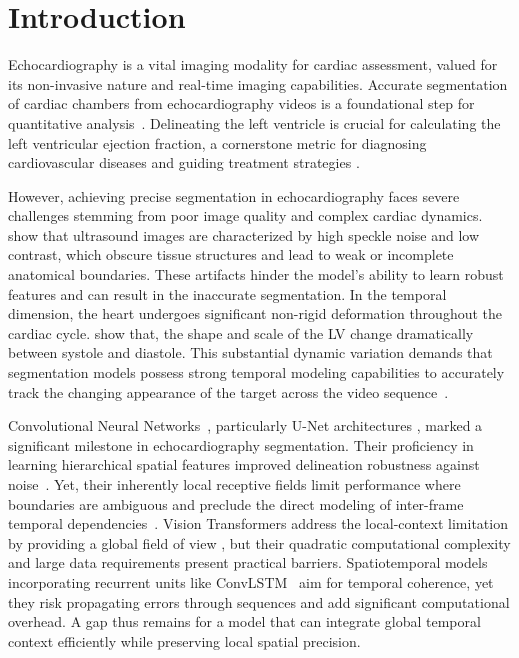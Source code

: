 \section{Introduction}
    \label{sec:intro}
Echocardiography is a vital imaging modality for cardiac assessment, valued for its non-invasive nature and real-time imaging capabilities. Accurate segmentation of cardiac chambers from echocardiography videos is a foundational step for quantitative analysis~\cite{el2022semi}. Delineating the left ventricle is crucial for calculating the left ventricular ejection fraction, a cornerstone metric for diagnosing cardiovascular diseases and guiding treatment strategies \cite{amer2021resdunet,yang2024echocardiography}.
%
                
%

However, achieving precise segmentation in echocardiography faces severe challenges stemming from poor image quality and complex cardiac dynamics.  show that ultrasound images are characterized by high speckle noise and low contrast, which obscure tissue structures and lead to weak or incomplete anatomical boundaries. These artifacts hinder the model's ability to learn robust features and can result in the inaccurate segmentation. In the temporal dimension, the heart undergoes significant non-rigid deformation throughout the cardiac cycle.  show that, the shape and scale of the LV change dramatically between systole and diastole. This substantial dynamic variation demands that segmentation models possess strong temporal modeling capabilities to accurately track the changing appearance of the target across the video sequence~\cite{li2024automatic}.

Convolutional Neural Networks~\cite{oshea2015introductionconvolutionalneuralnetworks}, particularly U-Net architectures \cite{ronneberger2015u,long2015fully,iglovikov2018ternausnet}, marked a significant milestone in echocardiography segmentation. Their proficiency in learning hierarchical spatial features improved delineation robustness against noise~\cite{jha2019resunet++}. Yet, their inherently local receptive fields limit performance where boundaries are ambiguous and preclude the direct modeling of inter-frame temporal dependencies~\cite{painchaud2022echocardiography}. Vision Transformers address the local-context limitation by providing a global field of view \cite{wang2025transformer,liao2023left}, but their quadratic computational complexity and large data requirements present practical barriers. Spatiotemporal models incorporating recurrent units like ConvLSTM~\cite{chen2021assessing} aim for temporal coherence, yet they risk propagating errors through sequences and add significant computational overhead. A gap thus remains for a model that can integrate global temporal context efficiently while preserving local spatial precision.

